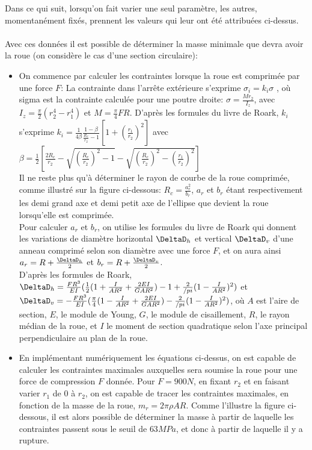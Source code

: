 \begin{itemize}
Dans ce qui suit, lorsqu'on fait varier une seul paramètre, les autres, momentanément fixés, prennent les valeurs qui leur ont été attribuées ci-dessus.
\\
\\ 
Avec ces données il est possible de déterminer la masse minimale que devra avoir la roue (on considère le cas d'une section circulaire):
\begin{itemize}
\item On commence par calculer les contraintes lorsque la roue est comprimée par une force $F$: La contrainte dans l'arrête extérieure s'exprime $\sigma_i=k_i\sigma$ \cite{roark},
où sigma est la contrainte calculée pour une poutre droite: $\sigma=\frac{Mr_2}{I_z}$, avec $I_z=\frac{\pi}{2}(r_2^4-r_1^4)$ et $M=\frac{\pi}{4}FR$.
D'après les formules du livre de Roark, $k_i$ s'exprime $k_i=\frac{1}{4\beta}\frac{1-\beta}{\frac{R_c}{r_2}-1}[1+(\frac{r_1}{r_2})^2]$ avec $\beta=\frac{1}{2}[\frac{2R_c}{r_2}-\sqrt{(\frac{R_c}{r_2})^2-1}-\sqrt{(\frac{R_c}{r_2})^2-(\frac{r_1}{r_2})^2}]$ \\
Il ne reste plus qu'à déterminer le rayon de courbe de la roue comprimée, comme illustré sur la figure ci-dessous: $R_c=\frac{a_r^2}{b_r}$, $a_r$ et $b_r$ étant respectivement les demi grand axe et demi petit axe de l'ellipse que devient la roue lorsqu'elle est comprimée.\\
Pour calculer $a_r$ et $b_r$, on utilise les formules du livre de Roark qui donnent les variations de diamètre horizontal $\DeltaD_h$ et vertical $\DeltaD_v$ d'une anneau comprimé selon son diamètre avec une force $F$, et on aura ainsi $a_r=R+\frac{\DeltaD_h}{2}$ et $b_r=R+\frac{\DeltaD_v}{2}$.\\
D'après les formules de Roark, $\DeltaD_h=\frac{FR^3}{EI}(\frac{1}{2}(1+\frac{I}{AR^2}+\frac{2EI}{GAR^2})-1+\frac{2}{/pi}(1-\frac{I}{AR^2})^2)$ et $\DeltaD_v=-\frac{FR^3}{EI}(\frac{\pi}{4}(1-\frac{I}{AR^2}+\frac{2EI}{GAR^2})-\frac{2}{/pi}(1-\frac{I}{AR^2})^2)$, où $A$ est l'aire de section, $E$, le module de Young, $G$, le module de cisaillement, $R$, le rayon médian de la roue, et $I$ le moment de section quadratique selon l'axe principal perpendiculaire au plan de la roue.
\item En implémentant numériquement les équations ci-dessus, on est capable de calculer les contraintes maximales auxquelles sera soumise la roue pour une force de compression $F$ donnée. Pour $F=900N$, en fixant $r_2$ et en faisant varier $r_1$ de $0$ à $r_2$, on est capable de tracer les contraintes maximales, en fonction de la masse de la roue, $m_r=2\pi\rho A R$. Comme l'illustre la figure ci-dessous, il est alors possible de déterminer la masse à partir de laquelle les contraintes passent sous le seuil de $63 MPa$, et donc à partir de laquelle il y a rupture.


\end{itemize}
\end{itemize}

